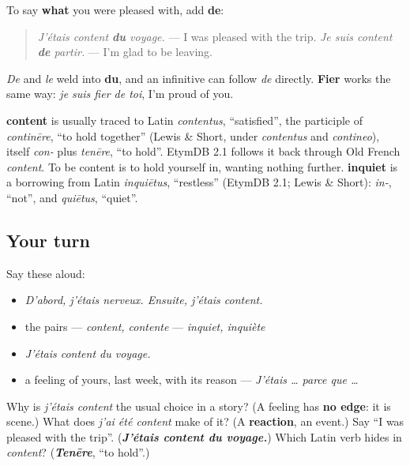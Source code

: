 \begin{grammarlens}[title={Grammar Lens: content de}]
To say \textbf{what} you were pleased with, add \textbf{de}:

\begin{quote}
\emph{J'étais content \textbf{du} voyage.} — I was pleased with the trip. \emph{Je suis content \textbf{de} partir.} — I'm glad to be leaving.
\end{quote}

\emph{De} and \emph{le} weld into \textbf{du}, and an infinitive can follow \emph{de} directly. \textbf{Fier} works the same way: \emph{je suis fier de toi}, I'm proud of you.
\end{grammarlens}

\begin{cousinweb}
\textbf{content} is usually traced to Latin \emph{contentus}, \textquotedblleft{}satisfied\textquotedblright{}, the participle of \emph{continēre}, \textquotedblleft{}to hold together\textquotedblright{} (Lewis \& Short, under \emph{contentus} and \emph{contineo}), itself \emph{con-} plus \emph{tenēre}, \textquotedblleft{}to hold\textquotedblright{}. EtymDB 2.1 follows it back through Old French \emph{content}. To be content is to hold yourself in, wanting nothing further. \textbf{inquiet} is a borrowing from Latin \emph{inquiētus}, \textquotedblleft{}restless\textquotedblright{} (EtymDB 2.1; Lewis \& Short): \emph{in-}, \textquotedblleft{}not\textquotedblright{}, and \emph{quiētus}, \textquotedblleft{}quiet\textquotedblright{}.
\end{cousinweb}

\subsection*{Your turn}
Say these aloud:

\begin{itemize}
\raggedright
  \item \emph{D'abord, j'étais nerveux. Ensuite, j'étais content.}
  \item the pairs — \emph{content, contente} — \emph{inquiet, inquiète}
  \item \emph{J'étais content du voyage.}
  \item a feeling of yours, last week, with its reason — \emph{J'étais … parce que …}
\end{itemize}

\begin{tcolorbox}[breakable,colback=teal!4,colframe=teal!35!black,title={Before you move on}]
Why is \emph{j'étais content} the usual choice in a story? (A feeling has \textbf{no edge}: it is scene.) What does \emph{j'ai été content} make of it? (A \textbf{reaction}, an event.) Say \textquotedblleft{}I was pleased with the trip\textquotedblright{}. (\emph{\textbf{J'étais content du voyage.}}) Which Latin verb hides in \emph{content}? (\emph{\textbf{Tenēre}}, \textquotedblleft{}to hold\textquotedblright{}.)
\end{tcolorbox}
